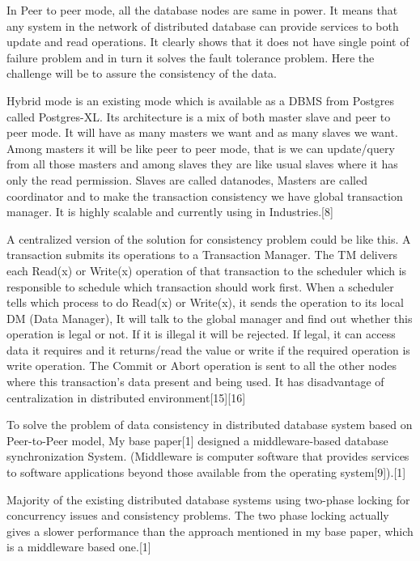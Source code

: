 \documentclass{article}[12pt,a4paper]
\begin{document}
In Peer to peer mode, all the database nodes are same in power. It means that any system in the network of distributed database can provide services to both update and read operations. It clearly shows that it does not have single point of failure problem and in turn it solves the fault tolerance problem. Here the challenge will be to assure the consistency of the data.

	Hybrid mode is an existing mode which is available as a DBMS from Postgres called Postgres-XL. Its architecture is a mix of both master slave and peer to peer mode. It will have as many masters we want and as many slaves we want. Among masters it will be like peer to peer mode, that is we can update/query from all those masters and among slaves they are like usual slaves where it has only the read permission. Slaves are called datanodes, Masters are called coordinator and to make the transaction consistency we have global transaction manager. It is highly scalable and currently using in Industries.[8]


	A centralized version of the solution for consistency problem could be like this. A transaction submits its operations to a Transaction Manager. The TM delivers each Read(x) or Write(x) operation of that transaction to the scheduler which is responsible to schedule which transaction should work first. When a scheduler tells which process to do Read(x) or Write(x), it sends the operation to its local DM (Data Manager), It will talk to the global manager and find out whether this operation is legal or not. If it is illegal it will be rejected. If legal, it can access data it requires and it returns/read the value or write if the required operation is write operation. The Commit or Abort operation is sent to all the other nodes where this transaction’s data present and being used. It has disadvantage of centralization in distributed environment[15][16]

To solve the problem of data consistency in distributed database system based on Peer-to-Peer model, My base paper[1] designed a middleware-based database synchronization System. (Middleware is computer software that provides services to software applications beyond those available from the operating system[9]).[1]



Majority of the existing distributed database systems using two-phase locking for concurrency issues and consistency problems. The two phase locking actually gives a slower performance than the approach mentioned in my base paper, which is a middleware based one.[1]
\end{document}
